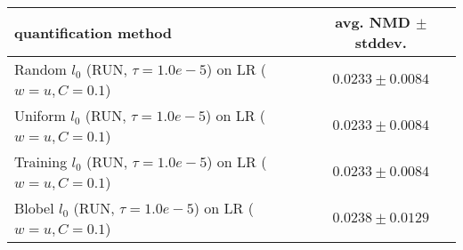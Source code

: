 \begin{tabular}{lc}
  \toprule
  quantification method & avg. NMD $\pm$ stddev. \\
  \midrule
  Random $l_0$ (RUN, $\tau=1.0e-5$) on LR ($w=u, C=0.1$) & $\mathbf{0.0233 \pm 0.0084}$ \\
  Uniform $l_0$ (RUN, $\tau=1.0e-5$) on LR ($w=u, C=0.1$) & $\mathbf{0.0233 \pm 0.0084}$ \\
  Training $l_0$ (RUN, $\tau=1.0e-5$) on LR ($w=u, C=0.1$) & $\mathbf{0.0233 \pm 0.0084}$ \\
  Blobel $l_0$ (RUN, $\tau=1.0e-5$) on LR ($w=u, C=0.1$) & $\mathbf{0.0238 \pm 0.0129}$ \\
  \bottomrule
\end{tabular}
